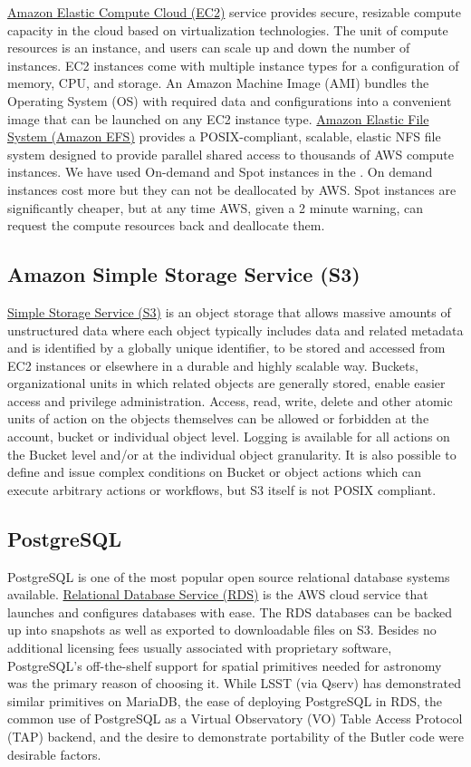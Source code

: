 \href{https://aws.amazon.com/ec2/}{Amazon Elastic Compute Cloud (EC2)} service provides secure, resizable compute capacity in the cloud based on virtualization technologies.
The unit of compute resources is an instance, and users can scale up and down the number of instances.
EC2 instances come with multiple instance types for a configuration of memory, CPU, and storage.
An Amazon Machine Image (AMI) bundles the Operating System (OS) with required data and configurations into a convenient image that can be launched on any EC2 instance type.
\href{https://aws.amazon.com/efs/}{Amazon Elastic File System (Amazon EFS)} provides a POSIX-compliant, scalable, elastic NFS file system designed to provide parallel shared access to thousands of AWS compute instances.
We have used On-demand and Spot instances in the \poc.
On demand instances cost more but they can not be deallocated by AWS.
Spot instances are significantly cheaper, but at any time AWS, given a 2 minute warning, can request the compute resources back and deallocate them.
\subsection{Amazon Simple Storage Service (S3)}
\href{https://aws.amazon.com/s3/}{Simple Storage Service (S3)} is an object storage that allows massive amounts of unstructured data where each object typically includes data and related metadata and is identified by a globally unique identifier, to be stored and accessed from EC2 instances or elsewhere in a durable and highly scalable way.
Buckets, organizational units in which related objects are generally stored, enable easier access and privilege administration.
Access, read, write, delete and other atomic units of action on the objects themselves can be allowed or forbidden at the account, bucket or individual object level.
Logging is available for all actions on the Bucket level and/or at the individual object granularity.
It is also possible to define and issue complex conditions on Bucket or object actions which can execute arbitrary actions or workflows, but S3 itself is not POSIX compliant.
\subsection{PostgreSQL}
PostgreSQL is one of the most popular open source relational database systems available.
\href{https://aws.amazon.com/rds/}{Relational Database Service (RDS)} is the AWS cloud service that launches and configures databases with ease.
The RDS databases can be backed up into snapshots as well as exported to downloadable files on S3.
Besides no additional licensing fees usually associated with proprietary software, PostgreSQL's off-the-shelf support for spatial primitives needed for astronomy was the primary reason of choosing it.
While LSST (via Qserv) has demonstrated similar primitives on MariaDB, the ease of deploying PostgreSQL in RDS, the common use of PostgreSQL as a Virtual Observatory (VO) Table Access Protocol (TAP) backend, and the desire to demonstrate portability of the Butler code were desirable factors.
